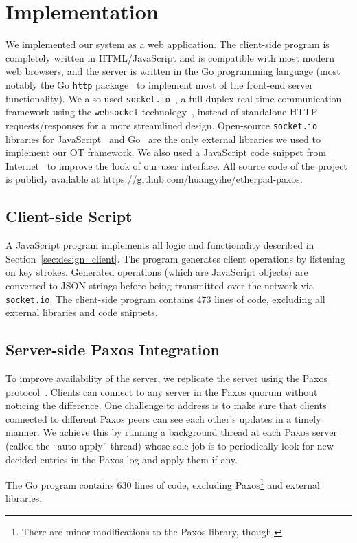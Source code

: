 \section{Implementation}

We implemented our system as a web application. The client-side program is
completely written in HTML/JavaScript and is compatible with most modern web
browsers, and the server is written in the Go programming language (most notably
the Go {\tt http} package~\cite{gohttp} to implement most of the front-end
server functionality). We also used {\tt socket.io}~\cite{socketio}, a full-duplex
real-time communication framework using the {\tt websocket}
technology~\cite{websock}, instead of standalone HTTP requests/responses for a
more streamlined design. Open-source {\tt socket.io} libraries for
JavaScript~\cite{jssocketio} and Go~\cite{gosocketio} are the only external
libraries we used to implement our OT framework. We also used a JavaScript code
snippet from Internet~\cite{linenumber} to improve the look of our user
interface. All source code of the project is publicly available at
\url{https://github.com/huangyihe/etherpad-paxos}.

\subsection{Client-side Script}

A JavaScript program implements all logic and functionality described in
Section~\ref{sec:design_client}. The program generates client operations by
listening on key strokes. Generated operations (which are JavaScript objects)
are converted to JSON strings before being transmitted over the network via {\tt
socket.io}. The client-side program contains 473 lines of code, excluding all
external libraries and code snippets.

\subsection{Server-side Paxos Integration}

To improve availability of the server, we replicate the server using the Paxos
protocol~\cite{lamport1998part}. Clients can connect to any server in the Paxos
quorum without noticing the difference. One challenge to address is to make sure
that clients connected to different Paxos peers can see each other's updates in
a timely manner. We achieve this by running a background thread at each Paxos
server (called the ``auto-apply'' thread) whose sole job is to periodically look
for new decided entries in the Paxos log and apply them if any.

The Go program contains 630 lines of code, excluding Paxos\footnote{There are
minor modifications to the Paxos library, though.} and external libraries.
